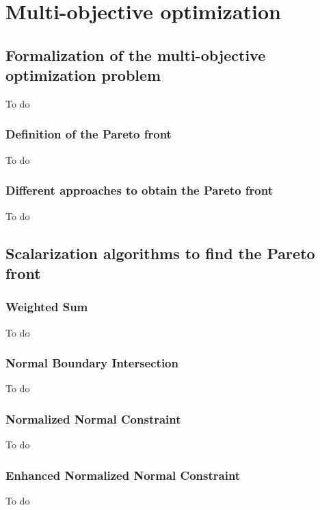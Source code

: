 \chapter{Multi-objective optimization}
\label{sec:Metodolgia}
\begin{refsection}
\section{Formalization of the multi-objective optimization problem}
\label{sec:MOOPForm}
%
To do
\subsection{Definition of the Pareto front}
To do
\subsection{Different approaches to obtain the Pareto front}
To do
\section{Scalarization algorithms to find the Pareto front}
\subsection{Weighted Sum}
\label{sec:WS}
To do
\subsection{Normal Boundary Intersection}
\label{sec:NBI}
To do
\subsection{Normalized Normal Constraint}
\label{sec:NNC}
To do
\subsection{Enhanced Normalized Normal Constraint}
\label{sec:ENNC}
To do

\end{refsection}
